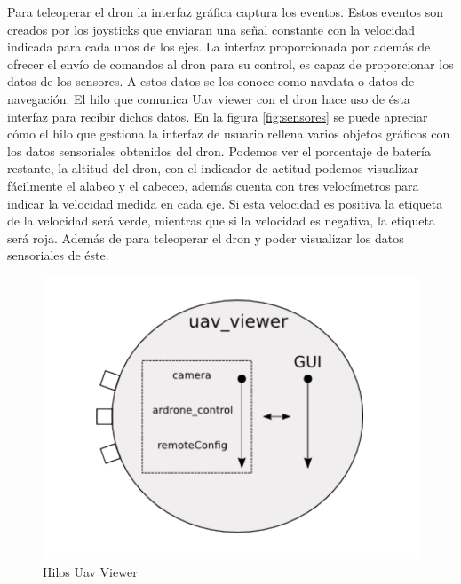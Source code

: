 Para teleoperar el dron la interfaz gráfica captura los eventos. Estos eventos son creados por los joysticks que enviaran una señal constante con la velocidad indicada para cada unos de los ejes. La interfaz proporcionada por además de ofrecer el envío de comandos al dron para su control, es capaz de proporcionar los datos de los sensores. A estos datos se los conoce como navdata o datos de navegación. El hilo que comunica Uav viewer con el dron hace uso de ésta interfaz para recibir dichos datos. En la figura \ref{fig:sensores} se puede apreciar cómo el hilo que gestiona la interfaz de usuario rellena varios objetos gráficos con los datos sensoriales obtenidos del dron. Podemos ver el porcentaje de batería restante, la altitud del dron, con el indicador de actitud podemos visualizar fácilmente el alabeo y el cabeceo, además cuenta con tres velocímetros para indicar la velocidad medida en cada eje. Si esta velocidad es positiva la etiqueta de la velocidad será verde, mientras que si la velocidad es negativa, la etiqueta será roja.
Además de para teleoperar el dron y poder visualizar los datos sensoriales de éste.

\begin{figure}[H]
  \centering
  \includegraphics[scale=0.3]{imagenes/uavViewer.png}
  \caption{Hilos Uav Viewer}
  \label{fig:uavViewer}
\end{figure}

